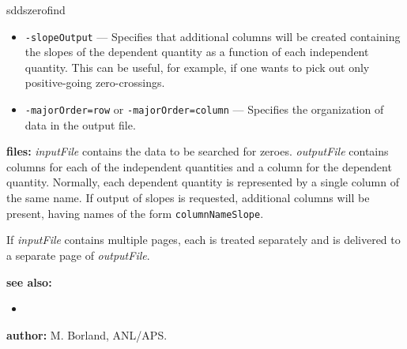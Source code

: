 \begin{sddsprog}{sddszerofind}
\begin{itemize}
      \item \verb|-slopeOutput| --- Specifies that additional columns will be created containing the slopes of the dependent quantity as a function of each independent quantity. This can be useful, for example, if one wants to pick out only positive-going zero-crossings.
      \item \verb|-majorOrder=row| or \verb|-majorOrder=column| --- Specifies the organization of data in the output file.
    \end{itemize}
  \item \textbf{files:}
    \emph{inputFile} contains the data to be searched for zeroes. \emph{outputFile} contains columns for each of the independent quantities and a column for the dependent quantity. Normally, each dependent quantity is represented by a single column of the same name. If output of slopes is requested, additional columns will be present, having names of the form {\tt columnNameSlope}.

    If \emph{inputFile} contains multiple pages, each is treated separately and is delivered to a separate page of \emph{outputFile}.
  \item \textbf{see also:}
    \begin{itemize}
      \item {}
    \end{itemize}
  \item \textbf{author:} M. Borland, ANL/APS.
\end{sddsprog}
